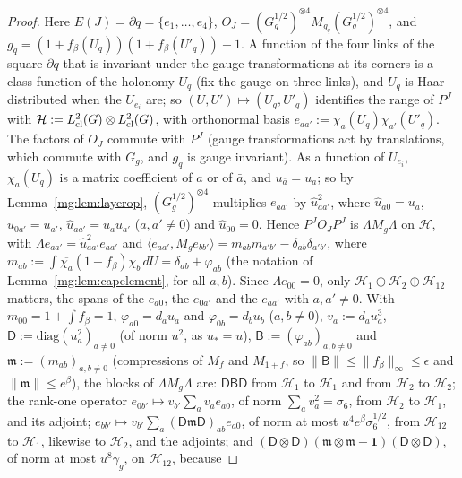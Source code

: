 \documentclass[11pt,a4paper]{article}
\theoremstyle{definition}
\theoremstyle{remark}
\newcommand{\ip}[2]{\langle #1,#2\rangle}
\newcommand{\dU}{\,dU}
\newcommand{\norm}[1]{\lVert #1\rVert}
\begin{document}
\begin{proof}
Here $E(J)=\partial q=\{e_1,\dots,e_4\}$, $O_J=(G_g^{1/2})^{\otimes4}M_{g_q}(G_g^{1/2})^{\otimes4}$, and $g_q=(1+f_\beta(U_q))(1+f_\beta(U'_q))-1$. A
function of the four links of the square $\partial q$ that is invariant under the gauge transformations at its corners is a class function of the
holonomy $U_q$ (fix the gauge on three links), and $U_q$ is Haar distributed when the $U_{e_i}$ are; so $(U,U')\mapsto(U_q,U'_q)$ identifies the range
of $P^J$ with $\mathcal H:=L^2_{\rm cl}(G)\otimes L^2_{\rm cl}(G)$, with orthonormal basis $e_{aa'}:=\chi_a(U_q)\chi_{a'}(U'_q)$. The factors of $O_J$
commute with $P^J$ (gauge transformations act by translations, which commute with $G_g$, and $g_q$ is gauge invariant). As a function of $U_{e_i}$,
$\chi_a(U_q)$ is a matrix coefficient of $a$ or of $\bar a$, and $u_{\bar a}=u_a$; so by Lemma~\ref{mg:lem:layerop}, $(G_g^{1/2})^{\otimes4}$ multiplies
$e_{aa'}$ by $\hat u_{aa'}^2$, where $\hat u_{a0}=u_a$, $\hat u_{0a'}=u_{a'}$, $\hat u_{aa'}=u_au_{a'}$ ($a,a'\ne0$) and $\hat u_{00}=0$. Hence
$P^JO_JP^J$ is $\Lambda M_g\Lambda$ on $\mathcal H$, with $\Lambda e_{aa'}=\hat u_{aa'}^2e_{aa'}$ and
$\ip{e_{aa'}}{M_ge_{bb'}}=m_{ab}m_{a'b'}-\delta_{ab}\delta_{a'b'}$, where $m_{ab}:=\int\overline{\chi_a}(1+f_\beta)\chi_b\dU=\delta_{ab}+\varphi_{ab}$ (the
notation of Lemma~\ref{mg:lem:capelement}, for all $a,b$). Since $\Lambda e_{00}=0$, only $\mathcal H_1\oplus\mathcal H_2\oplus\mathcal H_{12}$ matters, the
spans of the $e_{a0}$, the $e_{0a'}$ and the $e_{aa'}$ with $a,a'\ne0$. With $m_{00}=1+\int f_\beta=1$, $\varphi_{a0}=d_au_a$ and $\varphi_{0b}=d_bu_b$
($a,b\ne0$), $v_a:=d_au_a^3$, $\mathsf D:=\mathrm{diag}(u_a^2)_{a\ne0}$ (of norm $u^2$, as $u_*=u$), $\mathsf B:=(\varphi_{ab})_{a,b\ne0}$ and $\mathfrak m:=(m_{ab})_{a,b\ne0}$ (compressions of $M_f$ and
$M_{1+f}$, so $\norm{\mathsf B}\le\norm{f_\beta}_\infty\le\epsilon$ and $\norm{\mathfrak m}\le e^\beta$), the blocks of $\Lambda M_g\Lambda$ are: $\mathsf D\mathsf B\mathsf D$ from
$\mathcal H_1$ to $\mathcal H_1$ and from $\mathcal H_2$ to $\mathcal H_2$; the rank-one operator $e_{0b'}\mapsto v_{b'}\sum_av_ae_{a0}$, of norm
$\sum_av_a^2=\sigma_6$, from $\mathcal H_2$ to $\mathcal H_1$, and its adjoint; $e_{bb'}\mapsto v_{b'}\sum_a(\mathsf D\mathfrak m\mathsf D)_{ab}e_{a0}$, of norm at most
$u^4e^\beta\sigma_6^{1/2}$, from $\mathcal H_{12}$ to $\mathcal H_1$, likewise to $\mathcal H_2$, and the adjoints; and
$(\mathsf D\otimes\mathsf D)(\mathfrak m\otimes\mathfrak m-\mathbf1)(\mathsf D\otimes\mathsf D)$, of norm at most $u^8\gamma_g$, on $\mathcal H_{12}$, because

\end{proof}
\end{document}
